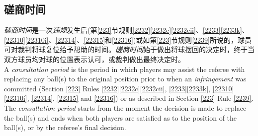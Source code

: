 \subsection{磋商时间}

\noindent \emph{磋商时间}是一次\emph{违规}发生后(第\ref{223}节规则\ref{2232}\ref{2232c}\ref{2232cii}、\ref{2233}\ref{2233k}、\ref{22310}\ref{22310i}、\ref{22314}、\ref{22315}和\ref{22316})或如第\ref{223}节规则\ref{2239}所说的，球员可对裁判将球复位给予帮助的时间。\emph{磋商时间}始于做出将球摆回的决定时，终于当双方球员均对球的位置表示认可，或裁判做出最终决定时。\\
A \emph{consultation period} is the period in which players may assist the referee with replacing any ball(s) to the original position prior to when an \emph{infringement} was committed (Section \ref{223} Rules \ref{2232}\ref{2232c}\ref{2232cii}, \ref{2233}\ref{2233k}, \ref{22310}\ref{22310i}, \ref{22314}, \ref{22315} and \ref{22316}) or as described in Section \ref{223} Rule \ref{2239}. The \emph{consultation period} starts from the moment the decision is made to replace the ball(s) and ends when both players are satisfied as to the position of the ball(s), or by the referee's final decision. 

